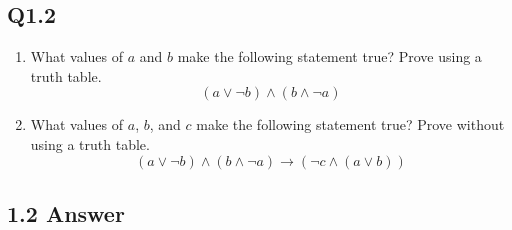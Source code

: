 \documentclass{article}
\begin{document}
\subsection*{Q1.2}
\begin{enumerate}[label=\alph*.]
    \item What values of $a$ and $b$ make the following statement true? Prove using a truth table.
    $$(a \lor \neg b) \land (b \land \neg a)$$
    \item What values of $a$, $b$, and $c$ make the following statement true? Prove without using a truth table.
    $$(a \lor \neg b) \land (b \land \neg a)\rightarrow (\neg c\land(a \lor b))$$
\end{enumerate}
\newpage
\subsection*{1.2 Answer}
\end{document}
